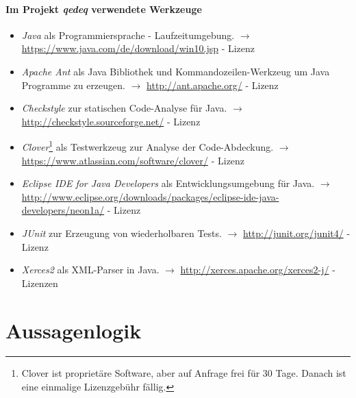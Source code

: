 \documentclass[english,ngerman,parskip=half,headsepline,footsepline]{scrreprt}
\newcounter{Enumi}
\begin{document}
	\paragraph{Im Projekt \emph{qedeq} verwendete Werkzeuge}
	\begin{itemize}
		\setcounter{enumi}{\value{Enumi}}

		\item\label{Werkzeug:Java}\emph{Java} als Programmiersprache - Laufzeitumgebung. $\rightarrow$ \url{https://www.java.com/de/download/win10.jsp} - Lizenz~\cite{bib:JavaSE}

		\item\label{Werkzeug:Apache Ant}\emph{Apache Ant} als Java Bibliothek und Kommandozeilen-Werkzeug um Java Programme zu erzeugen. $\rightarrow$ \url{http://ant.apache.org/} - Lizenz~\cite{bib:Apacheii}

		\item\label{Werkzeug:Checkstyle}\emph{Checkstyle} zur statischen Code-Analyse für Java. $\rightarrow$ \url{http://checkstyle.sourceforge.net/} - Lizenz~\cite{bib:LGPLii}

		\item\label{Werkzeug:Clover}\emph{Clover}\footnote{ Clover ist proprietäre Software, aber auf Anfrage frei für 30 Tage. Danach ist eine einmalige Lizenzgebühr fällig.} als Testwerkzeug zur Analyse der Code-Abdeckung. $\rightarrow$ \url{https://www.atlassian.com/software/clover/} - Lizenz~\cite{bib:Clover}

		\item\label{Werkzeug:Eclipse Java}\emph{Eclipse IDE for Java Developers} als Entwicklungsumgebung für Java. $\rightarrow$ \url{http://www.eclipse.org/downloads/packages/eclipse-ide-java-developers/neon1a/} - Lizenz~\cite{bib:OSI}

		\item\label{Werkzeug:JUnit}\emph{JUnit} zur Erzeugung von wiederholbaren Tests. $\rightarrow$ \url{http://junit.org/junit4/} - Lizenz~\cite{bib:EPL}

		\item\label{Werkzeug:Xerces2}\emph{Xerces2} als XML-Parser in Java. $\rightarrow$ \url{http://xerces.apache.org/xerces2-j/} - Lizenzen~\cite{bib:Apacheii, bib:SAX, bib:WDCDL, bib:WDCSNL}

		\setcounter{Enumi}{\value{enumi}}
	\end{itemize}

	\section{Aussagenlogik} %
	\label{sec:Aussagenlogik}
\end{document}
